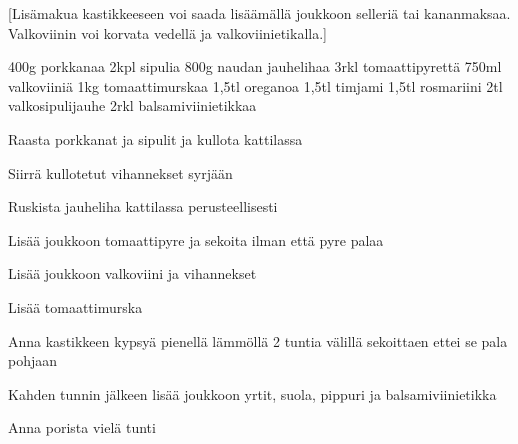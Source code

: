 [Lisämakua kastikkeeseen voi saada lisäämällä joukkoon selleriä tai kananmaksaa. Valkoviinin voi korvata vedellä ja valkoviinietikalla.]

\begin{step}
  400g porkkanaa
  2kpl sipulia
  800g naudan jauhelihaa
  3rkl tomaattipyrettä
  750ml valkoviiniä
  1kg tomaattimurskaa
  1,5tl oreganoa
  1,5tl timjami
  1,5tl rosmariini
  2tl valkosipulijauhe
  2rkl balsamiviinietikkaa


\method
Raasta porkkanat ja sipulit ja kullota kattilassa

Siirrä kullotetut vihannekset syrjään

Ruskista jauheliha kattilassa perusteellisesti

Lisää joukkoon tomaattipyre ja sekoita ilman että pyre palaa

Lisää joukkoon valkoviini ja vihannekset

Lisää tomaattimurska

Anna kastikkeen kypsyä pienellä lämmöllä 2 tuntia välillä sekoittaen ettei se pala pohjaan

Kahden tunnin jälkeen lisää joukkoon yrtit, suola, pippuri ja balsamiviinietikka

Anna porista vielä tunti

\end{step}
